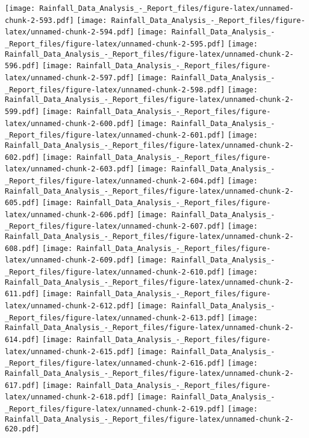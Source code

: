 \documentclass[
]{article}
\begin{document}
\texttt{[image: Rainfall\_Data\_Analysis\_-\_Report\_files/figure-latex/unnamed-chunk-2-593.pdf]}
\texttt{[image: Rainfall\_Data\_Analysis\_-\_Report\_files/figure-latex/unnamed-chunk-2-594.pdf]}
\texttt{[image: Rainfall\_Data\_Analysis\_-\_Report\_files/figure-latex/unnamed-chunk-2-595.pdf]}
\texttt{[image: Rainfall\_Data\_Analysis\_-\_Report\_files/figure-latex/unnamed-chunk-2-596.pdf]}
\texttt{[image: Rainfall\_Data\_Analysis\_-\_Report\_files/figure-latex/unnamed-chunk-2-597.pdf]}
\texttt{[image: Rainfall\_Data\_Analysis\_-\_Report\_files/figure-latex/unnamed-chunk-2-598.pdf]}
\texttt{[image: Rainfall\_Data\_Analysis\_-\_Report\_files/figure-latex/unnamed-chunk-2-599.pdf]}
\texttt{[image: Rainfall\_Data\_Analysis\_-\_Report\_files/figure-latex/unnamed-chunk-2-600.pdf]}
\texttt{[image: Rainfall\_Data\_Analysis\_-\_Report\_files/figure-latex/unnamed-chunk-2-601.pdf]}
\texttt{[image: Rainfall\_Data\_Analysis\_-\_Report\_files/figure-latex/unnamed-chunk-2-602.pdf]}
\texttt{[image: Rainfall\_Data\_Analysis\_-\_Report\_files/figure-latex/unnamed-chunk-2-603.pdf]}
\texttt{[image: Rainfall\_Data\_Analysis\_-\_Report\_files/figure-latex/unnamed-chunk-2-604.pdf]}
\texttt{[image: Rainfall\_Data\_Analysis\_-\_Report\_files/figure-latex/unnamed-chunk-2-605.pdf]}
\texttt{[image: Rainfall\_Data\_Analysis\_-\_Report\_files/figure-latex/unnamed-chunk-2-606.pdf]}
\texttt{[image: Rainfall\_Data\_Analysis\_-\_Report\_files/figure-latex/unnamed-chunk-2-607.pdf]}
\texttt{[image: Rainfall\_Data\_Analysis\_-\_Report\_files/figure-latex/unnamed-chunk-2-608.pdf]}
\texttt{[image: Rainfall\_Data\_Analysis\_-\_Report\_files/figure-latex/unnamed-chunk-2-609.pdf]}
\texttt{[image: Rainfall\_Data\_Analysis\_-\_Report\_files/figure-latex/unnamed-chunk-2-610.pdf]}
\texttt{[image: Rainfall\_Data\_Analysis\_-\_Report\_files/figure-latex/unnamed-chunk-2-611.pdf]}
\texttt{[image: Rainfall\_Data\_Analysis\_-\_Report\_files/figure-latex/unnamed-chunk-2-612.pdf]}
\texttt{[image: Rainfall\_Data\_Analysis\_-\_Report\_files/figure-latex/unnamed-chunk-2-613.pdf]}
\texttt{[image: Rainfall\_Data\_Analysis\_-\_Report\_files/figure-latex/unnamed-chunk-2-614.pdf]}
\texttt{[image: Rainfall\_Data\_Analysis\_-\_Report\_files/figure-latex/unnamed-chunk-2-615.pdf]}
\texttt{[image: Rainfall\_Data\_Analysis\_-\_Report\_files/figure-latex/unnamed-chunk-2-616.pdf]}
\texttt{[image: Rainfall\_Data\_Analysis\_-\_Report\_files/figure-latex/unnamed-chunk-2-617.pdf]}
\texttt{[image: Rainfall\_Data\_Analysis\_-\_Report\_files/figure-latex/unnamed-chunk-2-618.pdf]}
\texttt{[image: Rainfall\_Data\_Analysis\_-\_Report\_files/figure-latex/unnamed-chunk-2-619.pdf]}
\texttt{[image: Rainfall\_Data\_Analysis\_-\_Report\_files/figure-latex/unnamed-chunk-2-620.pdf]}
\end{document}
